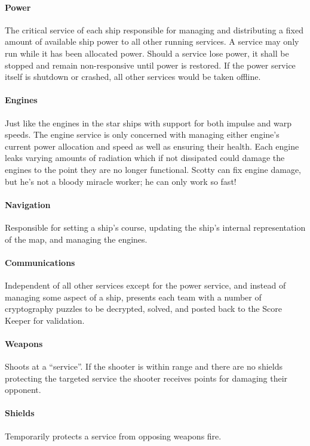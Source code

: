 \documentclass[10pt]{article}
\begin{document}
\paragraph*{Power} The critical service of each ship responsible for managing
and distributing a fixed amount of available ship power to all other running
services. A service may only run while it has been allocated power. Should a
service lose power, it shall be stopped and remain non-responsive until power is
restored. If the power service itself is shutdown or crashed, all other
services would be taken offline.

\paragraph*{Engines} Just like the engines in the star ships with support for
both impulse and warp speeds. The engine service is only concerned with
managing either engine's current power allocation and speed as well as ensuring
their health. Each engine leaks varying amounts of radiation which if not
dissipated could damage the engines to the point they are no longer functional.
Scotty can fix engine damage, but he's not a bloody miracle worker; he can only
work so fast!

\paragraph*{Navigation} Responsible for setting a ship's course, updating the
ship's internal representation of the map, and managing the engines.

\paragraph*{Communications} Independent of all other services except for the
power service, and instead of managing some aspect of a ship, presents each team
with a number of cryptography puzzles to be decrypted, solved, and posted back
to the Score Keeper for validation.

\paragraph*{Weapons} Shoots at a ``service''.  If the shooter is within range
and there are no shields protecting the targeted service the shooter receives
points for damaging their opponent.

\paragraph*{Shields} Temporarily protects a service from opposing weapons fire.
\end{document}
